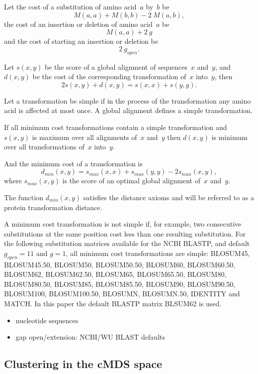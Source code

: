 \documentclass[10pt,a4paper]{article}
\begin{document}
Let the cost of a substitution of amino acid~$a$ by~$b$ be
$$ M(a,a) + M(b,b) - 2 \ M(a,b), $$
the cost of an insertion or deletion of amino acid~$a$ be
$$ M(a,a) + 2 \ g $$
and the cost of starting an insertion or deletion be
$$ 2 \ g_{open}. $$

Let $s(x,y)$ be the score of a global alignment of sequences~$x$ and~$y$, and $d(x,y)$ be the cost of the corresponding transformation of~$x$ into~$y$,
then
$$ 2 s(x,y) + d(x,y) = s(x,x) + s(y,y). $$

Let a transformation be simple if in the process of the transformation any amino acid is affected at most once.
A global alignment defines a simple transformation.

If all minimum cost transformations contain a simple transformation and $s(x,y)$ is maximum over all alignments of~$x$ and~$y$
then $d(x,y)$ is minimum over all transformations of~$x$ into~$y$.

And the minimum cost of a transformation is
$$ d_{min}(x,y) = s_{max}(x,x) + s_{max}(y,y) - 2 s_{max}(x,y), $$
where $s_{max}(x,y)$ is the score of an optimal global alignment of~$x$ and~$y$.

The function $d_{min}(x,y)$ satisfies the distance axioms and will be referred to as a protein transformation distance.

A minimum cost transformation is not simple if, for example, two consecutive substitutions at the same position cost less than one resulting substitution.
For the following substitution matrices available for the NCBI BLASTP, and default $g_{open} = 11$ and $g = 1$,
all minimum cost transformations are simple:
BLOSUM45, BLOSUM45.50, BLOSUM50, BLOSUM50.50, BLOSUM60, BLOSUM60.50, BLOSUM62, BLOSUM62.50, BLOSUM65, BLOSUM65.50, BLOSUM80, BLOSUM80.50, BLOSUM85, BLOSUM85.50,
BLOSUM90, BLOSUM90.50, BLOSUM100, BLOSUM100.50, BLOSUMN, BLOSUMN.50, IDENTITY and MATCH.
In this paper the default BLASTP matrix BLSUM62 is used.

\comm
{
\begin{itemize}
  \item nucleotide sequences
  \item gap open/extension: NCBI/WU BLAST defaults
\end{itemize}
}


\subsection {Clustering in the cMDS space}
\end{document}
